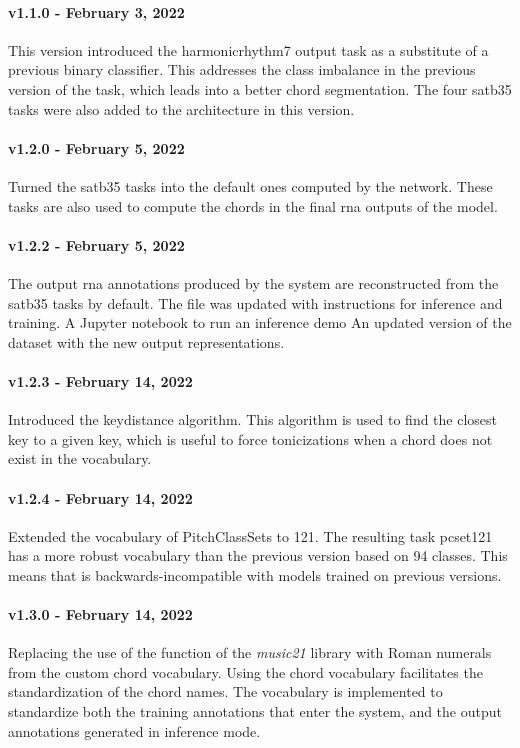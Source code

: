 \paragraph{v1.1.0 - February 3, 2022}
This version introduced the \gls{harmonicrhythm7} output
task as a substitute of a previous binary classifier. This
addresses the class imbalance in the previous version of the
task, which leads into a better chord segmentation. The four
\gls{satb35} tasks were also added to the architecture in
this version.

\paragraph{v1.2.0 - February 5, 2022}
Turned the \gls{satb35} tasks into the default ones computed
by the network. These tasks are also used to compute the
chords in the final \gls{rna} outputs of the model.

\paragraph{v1.2.2 - February 5, 2022}
The output \gls{rna} annotations produced by the system are
reconstructed from the \gls{satb35} tasks by default. The
 file was updated with instructions for
inference and training. A Jupyter notebook
\textcite{kluyver2016jupyter} to run an inference demo An
updated version of the dataset with the new output
representations.


\paragraph{v1.2.3 - February 14, 2022}
Introduced the keydistance algorithm. This algorithm is used
to find the closest key to a given key, which is useful to
force tonicizations when a chord does not exist in the
vocabulary.

\paragraph{v1.2.4 - February 14, 2022}
Extended the vocabulary of PitchClassSets to 121. The
resulting task \gls{pcset121} has a more robust vocabulary
than the previous version based on 94 classes. This means
that  is backwards-incompatible with models
trained on previous versions.

\paragraph{v1.3.0 - February 14, 2022}
Replacing the use of the 
function of the \emph{music21}
\parencite{cuthbert2010music21} library with Roman numerals
from the custom chord vocabulary. Using the chord vocabulary
facilitates the standardization of the chord names. The
vocabulary is implemented to standardize both the training
annotations that enter the system, and the output
annotations generated in inference mode.

